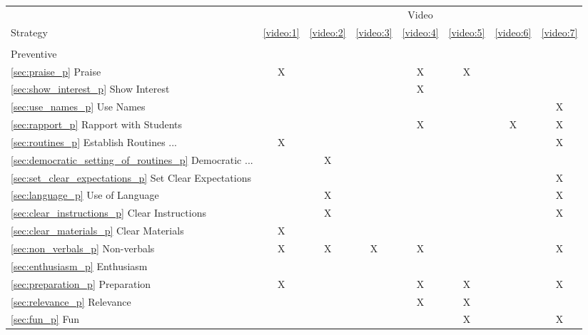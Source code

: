 \documentclass[12pt]{report}
\begin{document}
\pagebreak
\begin{longtable}{l|c|c|c|c|c|c|c|}

 & \multicolumn{7}{c}{Video} \\
Strategy & \ref{video:1} & \ref{video:2} & \ref{video:3} & \ref{video:4} & \ref{video:5} & \ref{video:6} & \ref{video:7} \\ \hline
\endhead
& & & & & & & \\
Preventive & & & & & & & \\ \hline
\ref{sec:praise_p}  Praise                                   &X& & &X&X& & \\
\ref{sec:show_interest_p} Show Interest                             & & & &X& & & \\
\ref{sec:use_names_p} Use Names                                 & & & & & & &X\\
\ref{sec:rapport_p} Rapport with Students                                   & & & &X& &X&X\\
\ref{sec:routines_p}  Establish Routines ...                              &X& & & & & &X\\
\hspace{6pt}\ref{sec:democratic_setting_of_routines_p} Democratic ... & &X& & & & & \\
\hspace{6pt}\ref{sec:set_clear_expectations_p} Set Clear Expectations       & & & & & & &X\\
\ref{sec:language_p} Use of Language                                   & &X& & & & &X\\
\hspace{6pt}\ref{sec:clear_instructions_p} Clear Instructions             & &X& & & & &X\\
\hspace{6pt}\ref{sec:clear_materials_p} Clear Materials                &X& & & & & & \\
\ref{sec:non_verbals_p} Non-verbals                                &X&X&X&X& & &X\\
\hspace{6pt}\ref{sec:enthusiasm_p} Enthusiasm                    & & & & & & & \\
\ref{sec:preparation_p} Preparation                                 &X& & &X&X& &X\\
\hspace{6pt}\ref{sec:relevance_p} Relevance                      & & & &X&X& & \\
\hspace{6pt}\ref{sec:fun_p} Fun                            & & & & &X& &X\\

\end{longtable}
\end{document}
